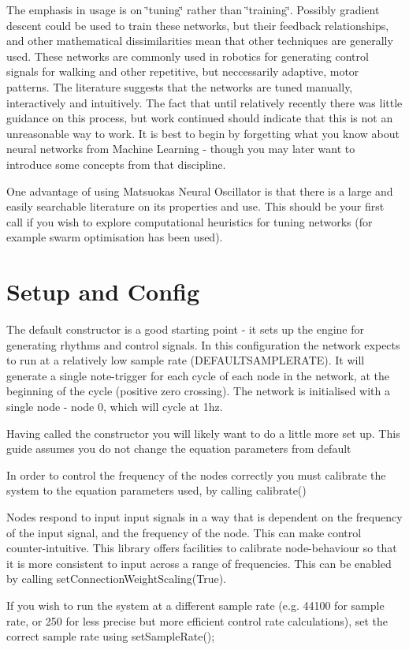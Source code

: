 The emphasis in usage is on \char`\"{}tuning\char`\"{} rather than \char`\"{}training\char`\"{}. Possibly gradient descent could be used to train these networks, but their feedback relationships, and other mathematical dissimilarities mean that other techniques are generally used. These networks are commonly used in robotics for generating control signals for walking and other repetitive, but neccessarily adaptive, motor patterns. The literature suggests that the networks are tuned manually, interactively and intuitively. The fact that until relatively recently there was little guidance on this process, but work continued should indicate that this is not an unreasonable way to work. It is best to begin by forgetting what you know about neural networks from Machine Learning -\/ though you may later want to introduce some concepts from that discipline.

One advantage of using Matsuoka\textquotesingle{}s Neural Oscillator is that there is a large and easily searchable literature on its properties and use. This should be your first call if you wish to explore computational heuristics for tuning networks (for example swarm optimisation has been used).

\section*{Setup and Config}

The default constructor is a good starting point -\/ it sets up the engine for generating rhythms and control signals. In this configuration the network expects to run at a relatively low sample rate (D\+E\+F\+A\+U\+L\+T\+S\+A\+M\+P\+L\+E\+R\+A\+TE). It will generate a single note-\/trigger for each cycle of each node in the network, at the beginning of the cycle (positive zero crossing). The network is initialised with a single node -\/ node 0, which will cycle at 1hz.

Having called the constructor you will likely want to do a little more set up. This guide assumes you do not change the equation parameters from default


\begin{DoxyEnumerate}
\item In order to control the frequency of the nodes correctly you must calibrate the system to the equation parameters used, by calling calibrate()
\item Nodes respond to input input signals in a way that is dependent on the frequency of the input signal, and the frequency of the node. This can make control counter-\/intuitive. This library offers facilities to calibrate node-\/behaviour so that it is more consistent to input across a range of frequencies. This can be enabled by calling set\+Connection\+Weight\+Scaling(\+True).
\item If you wish to run the system at a different sample rate (e.\+g. 44100 for sample rate, or 250 for less precise but more efficient control rate calculations), set the correct sample rate using set\+Sample\+Rate();
\end{DoxyEnumerate}

